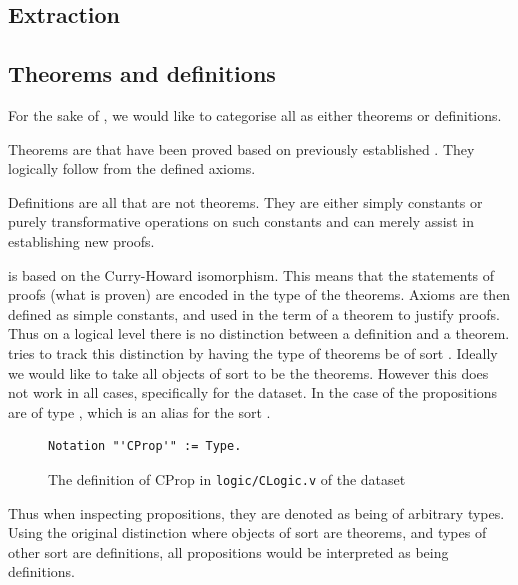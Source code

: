 \subsection{Extraction}
\label{section:extraction}


\subsection{Theorems and definitions}
\label{section:thmsdefs}

For the sake of \premiseselection, we would like to categorise all \coqobjs as either theorems or definitions.
\begin{definition}[theorem]
    Theorems are \coqobjs that have been proved based on previously established \coqobjs.
    They logically follow from the defined axioms.
\end{definition}

\begin{definition}[definition]
    Definitions are all \coqobjs that are not theorems.
    They are either simply constants or purely transformative operations on such constants
    and can merely assist in establishing new proofs.
\end{definition}

\coq is based on the Curry-Howard isomorphism.
This means that the statements of proofs (what is proven) are encoded in the type of the theorems.
Axioms are then defined as simple constants, and used in the term of a theorem to justify proofs.
Thus on a logical level there is no distinction between a definition and a theorem.
\coq tries to track this distinction by having the type of theorems be of sort \sortprop.
Ideally we would like to take all objects of sort \sortprop to be the theorems.
However this does not work in all cases, specifically for the \corn dataset.
In the case of \corn the propositions are of type \cprop, which is an alias for the sort \sorttype.

\begin{figure}[H]
	\begin{lstlisting}[language=Coq, mathescape]
Notation "'CProp'" := Type.
	\end{lstlisting}
	\caption{The definition of CProp in \texttt{logic/CLogic.v} of the \corn dataset}
\end{figure}

Thus when inspecting \corn propositions, they are denoted as being of arbitrary types.
Using the original distinction where objects of sort \sortprop are theorems, and types of other sort are definitions,
all \corn propositions would be interpreted as being definitions.


